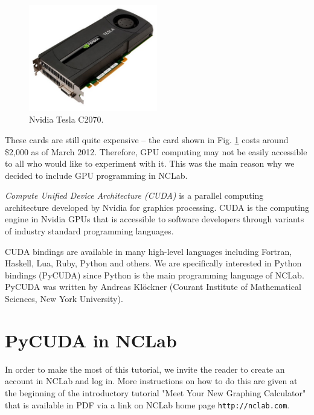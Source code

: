 \documentclass[article,A4,12pt]{llncs}
\begin{document}
\begin{figure}
\begin{center}
\includegraphics[width=0.5\textwidth]{img/tesla.png}
\caption{Nvidia Tesla C2070.}
\label{fig:tesla}
\end{center}
\end{figure}
\noindent
These cards are still quite expensive -- the card shown in Fig. \ref{fig:tesla} costs 
around \$2,000 as of March 2012. Therefore, GPU computing may not be easily accessible 
to all who would like to experiment with it. This was the main reason why we decided to 
include GPU programming in NCLab. 

{\em Compute Unified Device Architecture (CUDA)} is a parallel computing architecture 
developed by Nvidia for graphics processing. CUDA is the computing engine in 
Nvidia GPUs that is accessible to software developers through variants of 
industry standard programming languages.

CUDA bindings are available in many high-level languages including Fortran,
Haskell, Lua, Ruby, Python and others. We are specifically interested 
in Python bindings (PyCUDA) since Python is the main programming language 
of NCLab. PyCUDA was written by Andreas Kl\"ockner (Courant Institute 
of Mathematical Sciences, New York University).





\section{PyCUDA in NCLab}

In order to make the most of this tutorial, we invite the 
reader to create an account in NCLab and log in. More instructions 
on how to do this are given at the beginning of the introductory 
tutorial "Meet Your New Graphing Calculator" that is available in 
PDF via a link on NCLab home page {\tt http://nclab.com}. \\
\end{document}
